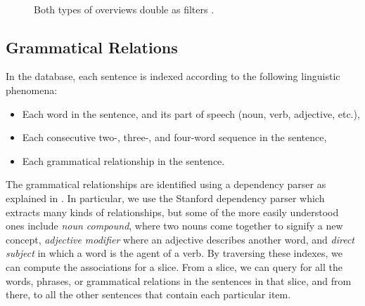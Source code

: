\documentclass{sig-alternate}
\begin{document}
\begin{figure}[ht!]
\begin{center}
%
        \\
%
    \end{center}
    \caption{%
     Both types of overviews double as filters \label{fig:intro04}.
     }%
\end{figure}

\subsection{Grammatical Relations}

 In the database, each sentence is indexed according to the following linguistic phenomena:
\begin{itemize}
  \item Each word in the sentence, and its part of speech (noun, verb, adjective, etc.),
  \item Each consecutive two-, three-, and four-word sequence in the sentence,
  \item Each grammatical relationship in the sentence. 
  \end{itemize}
  
  The grammatical relationships are identified using a dependency parser as explained in \cite{jurafsky_chapter_2009}. In particular, we use the Stanford dependency parser\cite{klein_accurate_2003} which extracts many kinds of relationships, but some of the more easily understood ones include \emph{noun compound}, where two nouns come together to signify a new concept, \emph{adjective modifier} where an adjective describes another word, and \emph{direct subject} in which a word is the agent of a verb. By traversing these indexes, we can compute the associations for a slice. From a slice, we can query for all the words, phrases, or grammatical relations in the sentences in that slice, and from there, to all the other sentences that contain each particular item.  
\end{document}
